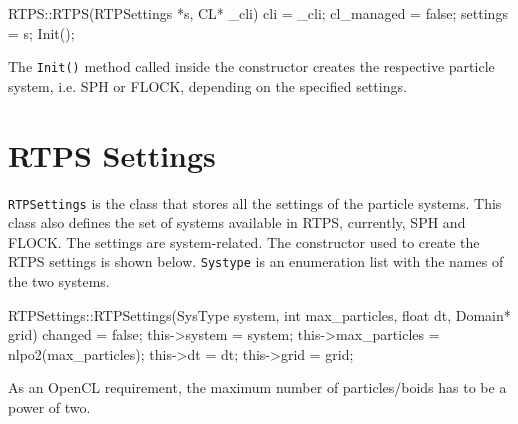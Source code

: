 
\begin{cppcode}{0}
RTPS::RTPS(RTPSettings *s, CL* _cli) 
{
	cli = _cli;
 	cl_managed = false;
	settings = s;
	Init();
}
\end{cppcode}
\vspace{16pt}

The \texttt{Init()} method called inside the constructor creates the respective particle system, i.e. SPH or FLOCK, depending on the specified settings.

\section{RTPS Settings}\label{rtpsettings}
\texttt{RTPSettings} is the class that stores all the settings of the particle systems. This class also defines the set of systems available in RTPS, currently, SPH and FLOCK.  The settings are system-related. 
The constructor used to create the RTPS settings is shown below. 
\texttt{Systype} is an enumeration list with the names of the two systems. 


\begin{cppcode}{0}
RTPSettings::RTPSettings(SysType system, int max_particles, float dt, Domain* grid)
{
	changed = false;
	this->system = system;
	this->max_particles = nlpo2(max_particles);
	this->dt = dt;
	this->grid = grid;
}
\end{cppcode}
\vspace{16pt}

As an OpenCL requirement, the maximum number of particles/boids has to be a power of two. 

